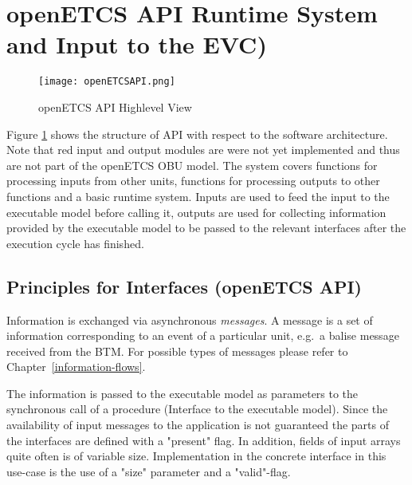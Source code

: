 
\section{openETCS {API} Runtime System and Input to the EVC)}
\label{chp_openETCS_API}

\begin{figure}[hbtp]
\centering
\texttt{[image: openETCSAPI.png]}
\caption{openETCS API Highlevel View}
\label{fig:apiHighLevel}
\end{figure}

Figure \ref{fig:apiHighLevel} shows the structure of API with respect to the software architecture. Note that red input and output modules are were not yet implemented and thus are not part of the openETCS OBU model. The system covers functions for processing inputs from other units, functions for processing outputs to other functions and a basic runtime system. Inputs are used to feed the input to the executable model before calling it, outputs are used for collecting information provided by the executable model to be passed to the relevant interfaces after the execution cycle has finished.

\subsection{Principles for Interfaces (openETCS {API})}

Information is exchanged via asynchronous \emph{messages}. A message is a set of information corresponding to an event of a particular unit, e.g.~a balise message received from the {BTM}. For possible types of messages please refer to Chapter~\ref{information-flows}.

The information is passed to the executable model as parameters to the synchronous call of a procedure (Interface to the executable model). Since the availability of input messages to the application is not guaranteed the parts of the interfaces are defined with a "present" flag. In addition, fields of input arrays quite often is of variable size. Implementation in the concrete interface in this use-case is the use of a "size" parameter and a "valid"-flag.


